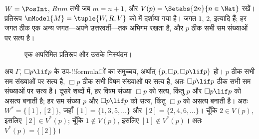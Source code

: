 \documentclass[../../../include/open-logic-section]{subfiles}
\begin{document}
\begin{ex}
  $W = \PosInt$, $Rnm$ तभी जब $m = n + 1$, और $V(p) = \Setabs{2n}{n
  \in \Nat}$ रखें। प्रतिरूप $\mModel{M} = \tuple{W, R, V}$ को
   में दर्शाया गया है। जगत $1$, $2$, इत्यादि
  हैं; हर जगत ठीक एक अन्य जगत---अपने उत्तरवर्ती---तक अभिगम रखता है, और
  $p$ ठीक सभी सम संख्याओं पर सत्य है।

  \begin{figure}
    \centering

    \caption{एक अपरिमित प्रतिरूप और उसके निस्यंदन।}
  \end{figure}
  
  अब $\Gamma$, $\Box p \lif p$ के उप-!!{formula}ों का समुच्चय, अर्थात्
  $\{p, \Box p, \Box p \lif p\}$ हो। $p$ ठीक सभी सम संख्याओं पर सत्य
  है, $\Box p$ ठीक सभी विषम संख्याओं पर सत्य है, अतः $\Box p \lif p$
  ठीक सभी सम संख्याओं पर सत्य है। दूसरे शब्दों में, हर विषम संख्या $\Box
  p$ को सत्य, किंतु $p$ और $\Box p \lif p$ को असत्य बनाती है; हर सम
  संख्या $p$ और $\Box p \lif p$ को सत्य, किंतु $\Box p$ को असत्य बनाती
  है। अतः $W^* = \{ [1], [2] \}$, जहाँ $[1] = \{1, 3, 5, \dots\}$ और
  $[2] = \{2, 4, 6, \dots\}$। चूँकि $2 \in V(p)$, इसलिए $[2] \in
  V^*(p)$; चूँकि $1 \notin V(p)$, इसलिए $[1] \notin V^*(p)$। अतः
  $V^*(p) = \{[2]\}$।


\end{ex}
\end{document}
